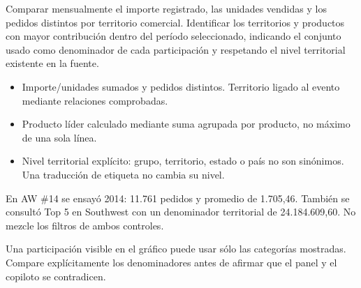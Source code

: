 \label{aw04}
\begin{goal}
Comparar mensualmente el importe registrado, las unidades vendidas y los pedidos distintos por territorio comercial. Identificar los territorios y productos con mayor contribución dentro del período seleccionado, indicando el conjunto usado como denominador de cada participación y respetando el nivel territorial existente en la fuente.
\end{goal}
\begin{itemize}
\item Importe/unidades sumados y pedidos distintos. Territorio ligado al evento mediante relaciones comprobadas.
\item Producto líder calculado mediante suma agrupada por producto, no máximo de una sola línea.
\item Nivel territorial explícito: grupo, territorio, estado o país no son sinónimos. Una traducción de etiqueta no cambia su nivel.
\end{itemize}
\begin{good}
En AW \#14 se ensayó 2014: 11.761 pedidos y promedio de 1.705,46. También se consultó Top 5 en Southwest con un denominador territorial de 24.184.609,60. No mezcle los filtros de ambos controles.
\end{good}
\begin{note}
Una participación visible en el gráfico puede usar sólo las categorías mostradas. Compare explícitamente los denominadores antes de afirmar que el panel y el copiloto se contradicen.
\end{note}

